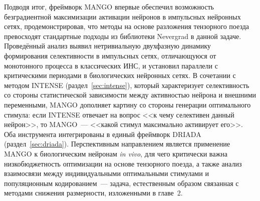 \medskip

Подводя итог, фреймворк MANGO впервые обеспечил возможность безградиентной максимизации активации нейронов в импульсных нейронных сетях, продемонстрировав, что методы на основе разложения тензорного поезда превосходят стандартные подходы из библиотеки Nevergrad в данной задаче. Проведённый анализ выявил нетривиальную двухфазную динамику формирования селективности в импульсных сетях, отличающуюся от монотонного процесса в классических ИНС, и установил параллели с критическими периодами в биологических нейронных сетях. В сочетании с методом INTENSE (раздел~\ref{sec:intense}), который характеризует селективность со стороны статистической зависимости между активностью нейрона и внешними переменными, MANGO дополняет картину со стороны генерации оптимального стимула: если INTENSE отвечает на вопрос <<к чему селективен данный нейрон>>, то MANGO~--- <<какой стимул максимально активирует его>>. Оба инструмента интегрированы в единый фреймворк DRIADA (раздел~\ref{sec:driada}). Перспективным направлением является применение MANGO к биологическим нейронам \textit{in vivo}, для чего критически важна низкобюджетность оптимизации на основе тензорного поезда, а также анализ взаимосвязи между индивидуальными оптимальными стимулами и популяционным кодированием~--- задача, естественным образом связанная с методами снижения размерности, изложенными в главе~2.

